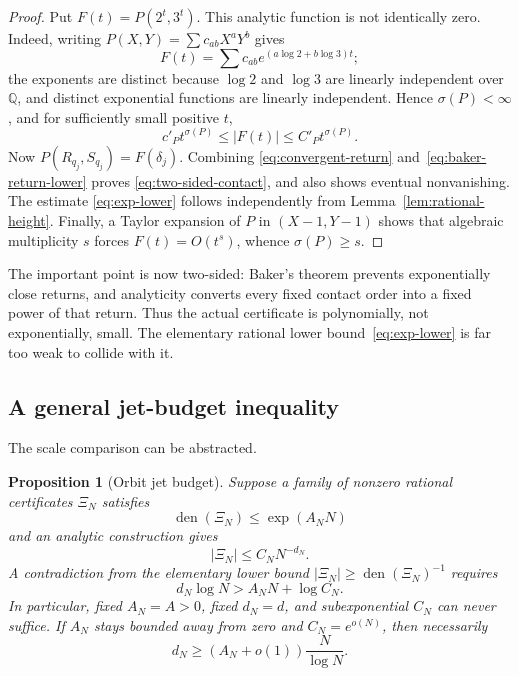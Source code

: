 \documentclass[11pt]{article}
\newtheorem{proposition}[theorem]{Proposition}
\theoremstyle{definition}
\theoremstyle{remark}
\newcommand{\Q}{\mathbb Q}
\newcommand{\den}{\operatorname{den}}
\begin{document}
\begin{proof}
Put $F(t)=P(2^t,3^t)$.  This analytic function is not identically zero.  Indeed, writing
$P(X,Y)=\sum c_{ab}X^aY^b$ gives
\[
 F(t)=\sum c_{ab}e^{(a\log2+b\log3)t};
\]
the exponents are distinct because $\log2$ and $\log3$ are linearly independent over
$\Q$, and distinct exponential functions are linearly independent.  Hence
$\sigma(P)<\infty$, and for sufficiently small positive $t$,
\[
 c'_P t^{\sigma(P)}\le |F(t)|\le C'_P t^{\sigma(P)}.
\]
Now $P(R_{q_j},S_{q_j})=F(\delta_j)$.  Combining
\eqref{eq:convergent-return} and~\eqref{eq:baker-return-lower} proves
\eqref{eq:two-sided-contact}, and also shows eventual nonvanishing.  The estimate
\eqref{eq:exp-lower} follows independently from Lemma~\ref{lem:rational-height}.
Finally, a Taylor expansion of $P$ in $(X-1,Y-1)$ shows that algebraic multiplicity $s$
forces $F(t)=O(t^s)$, whence $\sigma(P)\ge s$.
\end{proof}

The important point is now two-sided: Baker's theorem prevents exponentially close returns,
and analyticity converts every fixed contact order into a fixed power of that return.  Thus
the actual certificate is polynomially, not exponentially, small.  The elementary rational
lower bound~\eqref{eq:exp-lower} is far too weak to collide with it.

\subsection{A general jet-budget inequality}

The scale comparison can be abstracted.

\begin{proposition}[Orbit jet budget]\label{prop:jet-budget}
Suppose a family of nonzero rational certificates $\Xi_N$ satisfies
\begin{equation}
 \den(\Xi_N)\le \exp(A_NN)
 \label{eq:cert-den}
\end{equation}
and an analytic construction gives
\begin{equation}
 |\Xi_N|\le C_NN^{-d_N}.
 \label{eq:cert-upper}
\end{equation}
A contradiction from the elementary lower bound
$|\Xi_N|\ge\den(\Xi_N)^{-1}$ requires
\begin{equation}
 d_N\log N>A_NN+\log C_N.
 \label{eq:jet-threshold}
\end{equation}
In particular, fixed $A_N=A>0$, fixed $d_N=d$, and subexponential $C_N$ can never suffice.
If $A_N$ stays bounded away from zero and $C_N=e^{o(N)}$, then necessarily
\begin{equation}
 d_N\ge (A_N+o(1))\frac{N}{\log N}.
 \label{eq:jet-order}
\end{equation}
\end{proposition}
\end{document}
